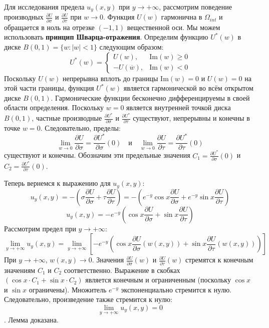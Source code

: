 \documentclass[12pt, a4paper]{article}
\begin{document}
	Для исследования предела $u_y(x,y)$ при $y \to +\infty$, рассмотрим поведение производных $\frac{\partial U}{\partial \sigma}$ и $\frac{\partial U}{\partial \tau}$ при $w \to 0$.
	Функция $U(w)$ гармонична в $\Omega_{int}$ и обращается в ноль на отрезке $(-1,1)$ вещественной оси. Мы можем использовать \textbf{принцип Шварца-отражения}. Определим функцию $U^*(w)$ в диске $B(0,1) = \{w: |w|<1\}$ следующим образом:
	$$ U^*(w) = \begin{cases}
		U(w), & \mathrm{Im}(w) \geq 0 \\
		-U(\overline{w}), & \mathrm{Im}(w) < 0
	\end{cases} $$
	Поскольку $U(w)$ непрерывна вплоть до границы $\mathrm{Im}(w)=0$ и $U(w)=0$ на этой части границы, функция $U^*(w)$ является гармонической во всём открытом диске $B(0,1)$.
	Гармонические функции бесконечно дифференцируемы в своей области определения. Поскольку $w=0$ является внутренней точкой диска $B(0,1)$, частные производные $\frac{\partial U^*}{\partial \sigma}$ и $\frac{\partial U^*}{\partial \tau}$ существуют, непрерывны и конечны в точке $w=0$. Следовательно, пределы:
	$$\lim_{w \to 0} \frac{\partial U}{\partial \sigma} = \frac{\partial U^*}{\partial \sigma}(0) \quad \text{и} \quad \lim_{w \to 0} \frac{\partial U}{\partial \tau} = \frac{\partial U^*}{\partial \tau}(0)$$
	существуют и конечны. Обозначим эти предельные значения $C_1 = \frac{\partial U^*}{\partial \sigma}(0)$ и $C_2 = \frac{\partial U^*}{\partial \tau}(0)$.
	
	Теперь вернемся к выражению для $u_y(x,y)$:
	$$u_y(x,y) = - \left( \sigma \frac{\partial U}{\partial \sigma} + \tau \frac{\partial U}{\partial \tau} \right) = - \left( e^{-y}\cos x \frac{\partial U}{\partial \sigma} + e^{-y}\sin x \frac{\partial U}{\partial \tau} \right)$$
	$$u_y(x,y) = - e^{-y} \left( \cos x \frac{\partial U}{\partial \sigma} + \sin x \frac{\partial U}{\partial \tau} \right)$$
	Рассмотрим предел при $y \to +\infty$:
	$$\lim_{y \to +\infty} u_y(x,y) = \lim_{y \to +\infty} \left[ - e^{-y} \left( \cos x \frac{\partial U}{\partial \sigma}(w(x,y)) + \sin x \frac{\partial U}{\partial \tau}(w(x,y)) \right) \right]$$
	При $y \to +\infty$, $w(x,y) \to 0$. Значения $\frac{\partial U}{\partial \sigma}(w)$ и $\frac{\partial U}{\partial \tau}(w)$ стремятся к конечным значениям $C_1$ и $C_2$ соответственно. Выражение в скобках $(\cos x \cdot C_1 + \sin x \cdot C_2)$ является конечным и ограниченным (поскольку $\cos x$ и $\sin x$ ограничены).
	Множитель $e^{-y}$ экспоненциально стремится к нулю.
	Следовательно, произведение также стремится к нулю:
	$$\lim_{y \to +\infty} u_y(x,y) = 0$$. Лемма доказана.
	
\end{document}
